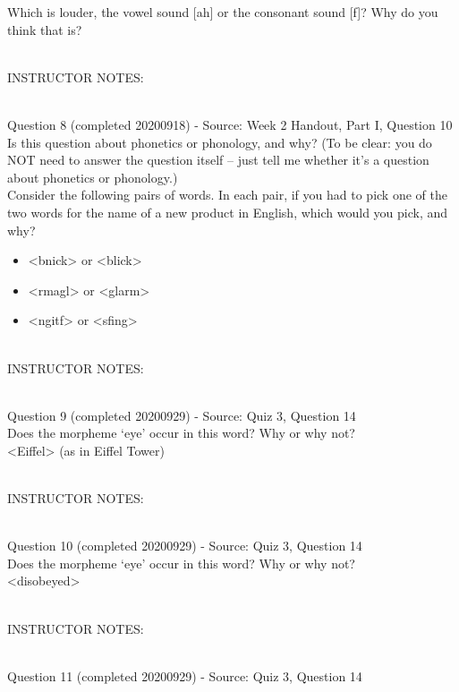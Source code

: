 \documentclass[12pt]{article}
\begin{document}
Which is louder, the vowel sound {[ah]} or the consonant sound {[f]}? Why do you think that is?


~\\
INSTRUCTOR NOTES: 


~\\

{\large Question 8} (completed 20200918) - Source: Week 2 Handout, Part I, Question 10\\

Is this question about phonetics or phonology, and why? (To be clear: you do NOT need to answer the question itself -- just tell me whether it's a question about phonetics or phonology.)\\

Consider the following pairs of words. In each pair, if you had to pick one of the two words for the name of a new product in English, which would you pick, and why? \begin{itemize} \item <bnick> or <blick> \item <rmagl> or <glarm> \item <ngitf> or <sfing> \end{itemize}


~\\
INSTRUCTOR NOTES: 


~\\

{\large Question 9} (completed 20200929) - Source: Quiz 3, Question 14\\

Does the morpheme ‘eye’ occur in this word? Why or why not?\\

<Eiffel> (as in Eiffel Tower)


~\\
INSTRUCTOR NOTES: 


~\\

{\large Question 10} (completed 20200929) - Source: Quiz 3, Question 14\\

Does the morpheme ‘eye’ occur in this word? Why or why not?\\

<disobeyed>


~\\
INSTRUCTOR NOTES: 


~\\

{\large Question 11} (completed 20200929) - Source: Quiz 3, Question 14\\
\end{document}
